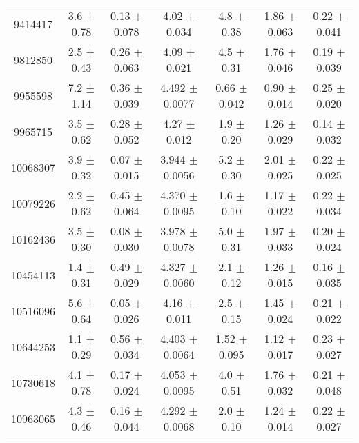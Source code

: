 \documentclass[epjCONF,columns]{svjour} %
\begin{document}
\begin{table*}
\begin{tabular}{c|cccccc}
9414417  &        3.6    $\pm$  0.78   &      0.13   $\pm$  0.078  &      4.02   $\pm$  0.034  &      4.8    $\pm$  0.38   &      1.86   $\pm$  0.063  &      0.22   $\pm$  0.041    \\
9812850  &        2.5    $\pm$  0.43   &      0.26   $\pm$  0.063  &      4.09   $\pm$  0.021  &      4.5    $\pm$  0.31   &      1.76   $\pm$  0.046  &      0.19   $\pm$  0.039    \\
9955598  &        7.2    $\pm$  1.14   &      0.36   $\pm$  0.039  &      4.492  $\pm$  0.0077 &      0.66   $\pm$  0.042  &      0.90   $\pm$  0.014  &      0.25   $\pm$  0.020    \\
9965715  &        3.5    $\pm$  0.62   &      0.28   $\pm$  0.052  &      4.27   $\pm$  0.012  &      1.9    $\pm$  0.20   &      1.26   $\pm$  0.029  &      0.14   $\pm$  0.032    \\
10068307 &        3.9    $\pm$  0.32   &      0.07   $\pm$  0.015  &      3.944  $\pm$  0.0056 &      5.2    $\pm$  0.30   &      2.01   $\pm$  0.025  &      0.22   $\pm$  0.025    \\
10079226 &        2.2    $\pm$  0.62   &      0.45   $\pm$  0.064  &      4.370  $\pm$  0.0095 &      1.6    $\pm$  0.10   &      1.17   $\pm$  0.022  &      0.22   $\pm$  0.034    \\
10162436 &        3.5    $\pm$  0.30   &      0.08   $\pm$  0.030  &      3.978  $\pm$  0.0078 &      5.0    $\pm$  0.31   &      1.97   $\pm$  0.033  &      0.20   $\pm$  0.024    \\
10454113 &        1.4    $\pm$  0.31   &      0.49   $\pm$  0.029  &      4.327  $\pm$  0.0060 &      2.1    $\pm$  0.12   &      1.26   $\pm$  0.015  &      0.16   $\pm$  0.035    \\
10516096 &        5.6    $\pm$  0.64   &      0.05   $\pm$  0.026  &      4.16   $\pm$  0.011  &      2.5    $\pm$  0.15   &      1.45   $\pm$  0.024  &      0.21   $\pm$  0.022    \\
10644253 &        1.1    $\pm$  0.29   &      0.56   $\pm$  0.034  &      4.403  $\pm$  0.0064 &      1.52   $\pm$  0.095  &      1.12   $\pm$  0.017  &      0.23   $\pm$  0.027    \\
10730618 &        4.1    $\pm$  0.78   &      0.17   $\pm$  0.024  &      4.053  $\pm$  0.0095 &      4.0    $\pm$  0.51   &      1.76   $\pm$  0.032  &      0.21   $\pm$  0.048    \\
10963065 &        4.3    $\pm$  0.46   &      0.16   $\pm$  0.044  &      4.292  $\pm$  0.0068 &      2.0    $\pm$  0.10   &      1.24   $\pm$  0.014  &      0.22   $\pm$  0.027    \\

\end{tabular}
\end{table*}
\end{document}
